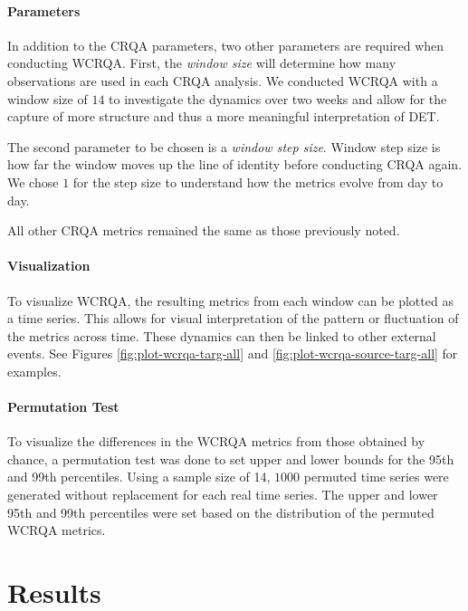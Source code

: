 \documentclass[
  english,
  man]{apa6}
\let\oldparagraph\paragraph
\renewcommand{\paragraph}[1]{\oldparagraph{#1}\mbox{}}
\begin{document}
\hypertarget{parameters-1}{%
\paragraph{Parameters}\label{parameters-1}}

In addition to the CRQA parameters, two other parameters are required when
conducting WCRQA. First, the \emph{window size} will determine how many observations
are used in each CRQA analysis. We conducted WCRQA with a window size of \(14\) to
investigate the dynamics over two weeks and allow for the capture of more
structure and thus a more meaningful interpretation of DET.

The second parameter to be chosen is a \emph{window step size}. Window step size is
how far the window moves up the line of identity before conducting CRQA again.
We chose \(1\) for the step size to understand how the metrics evolve from day to
day.

All other CRQA metrics remained the same as those previously noted.

\hypertarget{visualization-1}{%
\paragraph{Visualization}\label{visualization-1}}

To visualize WCRQA, the resulting metrics from each window can be plotted as a
time series. This allows for visual interpretation of the pattern or fluctuation
of the metrics across time. These dynamics can then be linked to other external
events. See Figures \ref{fig:plot-wcrqa-targ-all} and
\ref{fig:plot-wcrqa-source-targ-all} for examples.

\hypertarget{permutation-test-1}{%
\paragraph{Permutation Test}\label{permutation-test-1}}

To visualize the differences in the WCRQA metrics from those obtained by chance,
a permutation test was done to set upper and lower bounds for the 95th and 99th
percentiles. Using a sample size of 14, \(1000\) permuted time series were
generated without replacement for each real time series. The upper and lower
95th and 99th percentiles were set based on the distribution of the permuted
WCRQA metrics.

\hypertarget{results}{%
\section{Results}\label{results}}
\end{document}
